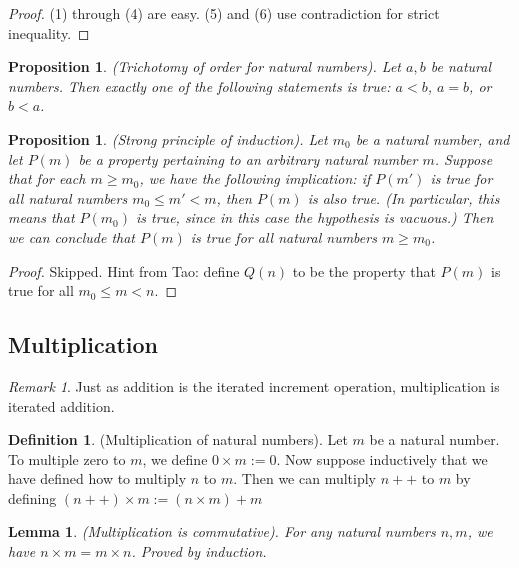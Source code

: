 \documentclass[12pt]{article}
\newtheorem{lemma}[theorem]{Lemma}
\newtheorem{proposition}[theorem]{Proposition}
\theoremstyle{definition}
\newtheorem{definition}[theorem]{Definition}
\theoremstyle{remark}
\newtheorem*{remark}{Remark}
\begin{document}
\begin{proof}
    (1) through (4) are easy. (5)  and (6) use contradiction for strict inequality.
\end{proof}

\begin{proposition}
    (Trichotomy of order for natural numbers). Let $a,b$ be natural numbers. Then exactly one of the following statements is true: $a < b$, $a = b$, or $b < a$.
\end{proposition}

\begin{proposition}
    (Strong principle of induction). Let $m_0$ be a natural number, and let $P(m)$ be a property pertaining to an arbitrary natural number $m$. Suppose that for each $m \geq m_0$, we have the following implication: if $P(m')$ is true for all natural numbers $m_0 \leq m' < m$, then $P(m)$ is also true. (In particular, this means that $P(m_0)$ is true, since in this case the hypothesis is vacuous.) Then we can conclude that $P(m)$ is true for all natural numbers $m \geq m_0$.
\end{proposition}

\begin{proof}
    Skipped. Hint from Tao: define $Q(n)$ to be the property that $P(m)$ is true for all $m_0 \leq m < n$.
\end{proof}

\subsection{Multiplication}

\begin{remark}
    Just as addition is the iterated increment operation, multiplication is iterated addition.
\end{remark}

\begin{definition}
    (Multiplication of natural numbers). Let $m$ be a natural number. To multiple zero to $m$, we define $0 \times m := 0$. Now suppose inductively that we have defined how to multiply $n$ to $m$. Then we can multiply $n++$ to $m$ by defining $(n++) \times m := (n \times m) + m$
\end{definition}

\begin{lemma}
    (Multiplication is commutative). For any natural numbers $n,m$, we have $n \times m = m \times n$. Proved by induction.
\end{lemma}
\end{document}

